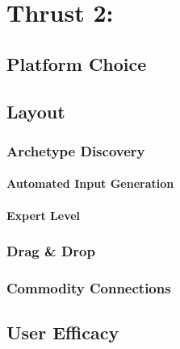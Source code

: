 \chapter{Thrust 2: }\label{chap:thrust2}

\section{Platform Choice}

\section{Layout}

\subsection{Archetype Discovery}

\subsubsection{Automated Input Generation}

\subsubsection{Expert Level}

\subsection{Drag \& Drop}

\subsection{Commodity Connections}

\section{User Efficacy}


